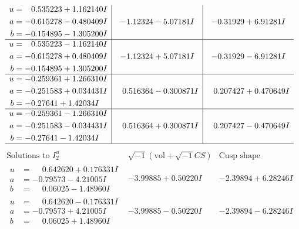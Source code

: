 \documentclass[1p]{elsarticle_modified}
\theoremstyle{definition}
\newcommand{\I}{\sqrt{-1}}
\begin{document}
$$\begin{array}{c|c|c}
\begin{aligned}
u &= \phantom{-}0.535223 + 1.162140 I \\
a &= -0.615278 - 0.480409 I \\
b &= -0.154895 - 1.305200 I\end{aligned}
 & -1.12324 - 5.07181 I & -0.31929 + 6.91281 I \\ \hline\begin{aligned}
u &= \phantom{-}0.535223 - 1.162140 I \\
a &= -0.615278 + 0.480409 I \\
b &= -0.154895 + 1.305200 I\end{aligned}
 & -1.12324 + 5.07181 I & -0.31929 - 6.91281 I \\ \hline\begin{aligned}
u &= -0.259361 + 1.266310 I \\
a &= -0.251583 + 0.034431 I \\
b &= -0.27641 + 1.42034 I\end{aligned}
 & \phantom{-}0.516364 - 0.300871 I & \phantom{-}0.207427 + 0.470649 I \\ \hline\begin{aligned}
u &= -0.259361 - 1.266310 I \\
a &= -0.251583 - 0.034431 I \\
b &= -0.27641 - 1.42034 I\end{aligned}
 & \phantom{-}0.516364 + 0.300871 I & \phantom{-}0.207427 - 0.470649 I\\
 \hline 
 \end{array}$$\newpage$$\begin{array}{c|c|c}  
\text{Solutions to }I^u_{2}& \I (\text{vol} + \sqrt{-1}CS) & \text{Cusp shape}\\
 \hline 
\begin{aligned}
u &= \phantom{-}0.642620 + 0.176331 I \\
a &= -0.79573 - 4.21005 I \\
b &= \phantom{-}0.06025 - 1.48960 I\end{aligned}
 & -3.99885 + 0.50220 I & -2.39894 + 6.28246 I \\ \hline\begin{aligned}
u &= \phantom{-}0.642620 - 0.176331 I \\
a &= -0.79573 + 4.21005 I \\
b &= \phantom{-}0.06025 + 1.48960 I\end{aligned}
 & -3.99885 - 0.50220 I & -2.39894 - 6.28246 I \\ \hline\begin{aligned}

\end{aligned}
\end{array}$$
\end{document}
